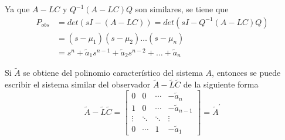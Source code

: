 Ya que \( A-LC \) y \( Q^{-1}(A-LC)Q \) son similares, se tiene que
\[
    \begin{split}
        P_{obs} & = det(sI-(A-LC)) = det(sI-Q^{-1}(A-LC)Q) \\
        & = (s-\mu_{1}) (s-\mu_{2}) \ldots (s-\mu_{n}) \\
        & = s^{n} +\tilde{a}_{1}s^{n-1} + \tilde{a}_{2}s^{n-2} + \ldots + \tilde{a}_{n}
    \end{split}
\]

Si \( \tilde{A} \) se obtiene del polinomio característico del sistema \( A \), entonces se puede escribir el sistema similar del observador \( \tilde{A}-\tilde{L}\tilde{C} \) de la siguiente forma
\[
    \tilde{A}-\tilde{L}\tilde{C}=
    \begin{bmatrix}
        0 & 0 & \cdots & -\tilde{a}_{n} \\
        1 & 0 & \cdots & -\tilde{a}_{n-1} \\
        \vdots & \ddots & \ddots & \vdots \\
        0 & \cdots & 1 & -\tilde{a}_{1}
    \end{bmatrix} = \tilde{A}^{'}
\]

